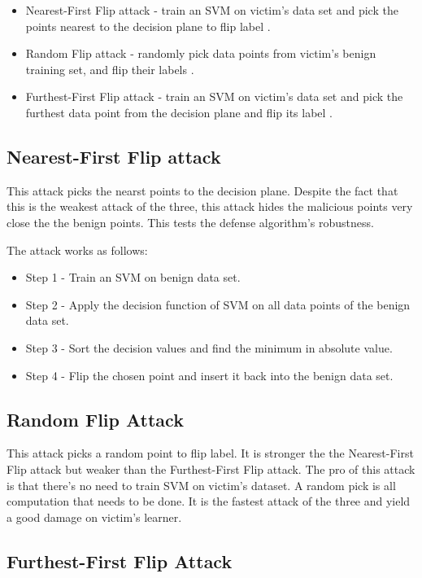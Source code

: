 \documentclass[10pt,conference,compsocconf,letterpaper]{IEEEtran}
\begin{document}
\begin{itemize}
\item Nearest-First Flip attack - train an SVM on victim's data set and pick the points nearest to the decision plane to flip label \cite{xiao12}.
\item Random Flip attack - randomly pick data points from victim's benign training set, and flip their labels \cite{xiao12}.
\item Furthest-First Flip attack - train an SVM on victim's data set and pick the furthest data point from the decision plane and flip its label \cite{xiao12}.
\end{itemize}

\subsection{Nearest-First Flip attack}

This attack picks the nearst points to the decision plane. Despite the fact that this is the weakest attack of the three, this attack hides the malicious points very close the the benign points. This tests the defense algorithm's robustness.

The attack works as follows:

\begin{itemize}
\item Step 1 - Train an SVM on benign data set.
\item Step 2 - Apply the decision function of SVM on all data points of the benign data set.
\item Step 3 - Sort the decision values and find the minimum in absolute value.
\item Step 4 - Flip the chosen point and insert it back into the benign data set.
\end{itemize}

\subsection{Random Flip Attack}

This attack picks a random point to flip label. It is stronger the the Nearest-First Flip attack but weaker than the Furthest-First Flip attack. The pro of this attack is that there's no need to train SVM on victim's dataset. A random pick is all computation that needs to be done. It is the fastest attack of the three and yield a good damage on victim's learner.

\subsection{Furthest-First Flip Attack}
\end{document}
